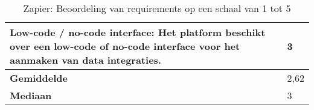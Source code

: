 \begin{landscape}
\begin{table}[H]
{\begin{tabular}{|ll|}
\multicolumn{1}{|l|}{Low-code / no-code interface: Het platform beschikt over een low-code of no-code interface voor het aanmaken van data integraties.}                                                                   & 3                            \\ \hline
\multicolumn{1}{|l|}{\textbf{Gemiddelde}}                                                                                                                                                                                  & 2,62                            \\ \hline
\multicolumn{1}{|l|}{\textbf{Mediaan}}                                                                                                                                                                                     & 3                            \\ \hline
\end{tabular}
}
\caption{Zapier: Beoordeling van requirements op een schaal van 1 tot 5}
\end{table}

\end{landscape}